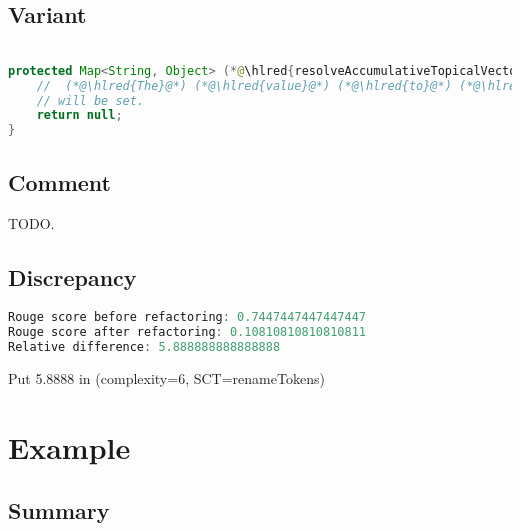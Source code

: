 \documentclass[11pt]{article}
\DeclareRobustCommand{\hlred}[1]{{\sethlcolor{YellowOrange}\hl{#1}}}
\begin{document}
  \subsection{Variant}

  \begin{lstlisting}[language=java]

protected Map<String, Object> (*@\hlred{resolveAccumulativeTopicalVector}@*)(final ITemplateContext context, final IProcessableElementTag tag, final AttributeName attributeName, final String attributeValue, final IStandardExpression expression) {
    //  (*@\hlred{The}@*) (*@\hlred{value}@*) (*@\hlred{to}@*) (*@\hlred{the}@*) (*@\hlred{given}@*) (*@\hlred{expression}@*) (*@\hlred{as}@*) (*@\hlred{map}@*) (*@\hlred{key}@*) (*@\hlred{if}@*) (*@\hlred{found}@*) (*@\hlred{then value as}@*)
    // will be set.
    return null;
}
  \end{lstlisting}

  \subsection{Comment}

  TODO.

  \subsection{Discrepancy}

  \begin{lstlisting}[language=java]
Rouge score before refactoring: 0.7447447447447447
Rouge score after refactoring: 0.10810810810810811
Relative difference: 5.888888888888888
  \end{lstlisting}

  Put 5.8888 in (complexity=6, SCT=renameTokens)

  \pagebreak
  \section{Example}
  \subsection{Summary}
\end{document}

